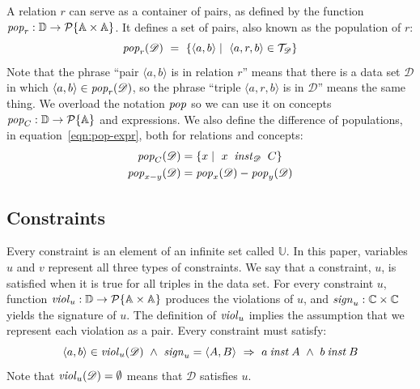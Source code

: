 \documentclass[runningheads]{llncs}
\newcommand{\id}[1]{\text{\it #1\/}}
\newcommand{\popF}[1]{\id{pop}_{#1}}
\newcommand{\pop}[2]{\popF{#1}(#2)}
\newcommand{\instance}{\mathbin{\id{inst}}}
\newcommand{\viol}[2]{\violC{#1}(#2)}
\newcommand{\violC}[1]{\id{viol}_{#1}}
\newcommand{\sign}[1]{\id{sign}_{#1}}
\newcommand{\powerset}[1]{\cal{P}\{#1\}}
\newcommand{\declare}[3]{\id{#1}_{\pair{#2}{#3}}}
\newcommand{\pair}[2]{\langle{#1},{#2}\rangle}
\newcommand{\Pair}[2]{#1\times#2}
\newcommand{\triple}[3]{\langle{#1},{#2},{#3}\rangle}
\newcommand{\Atoms}{\mathbb{A}}
\newcommand{\Concepts}{\mathbb{C}}
\newcommand{\triples}{\mathcal{T}}
\newcommand{\Constraints}{\mathbb{U}}
\newcommand{\dataset}{\mathscr{D}}
\newcommand{\Dataset}{\mathbb{D}}
\begin{document}
   A relation $r$ can serve as a container of pairs,
   as defined by the function $\popF{r}:\Dataset\rightarrow\powerset{\Pair{\Atoms}{\Atoms}}$.
   It defines a set of pairs, also known as the population of $r$:
\begin{equation}
   \pop{r}{\dataset}\ =\ \{ \pair{a}{b}\mid\ \triple{a}{r}{b}\in\triples_{\dataset}\}
\label{eqn:pop-rel}
\end{equation}
   Note that the phrase ``pair $\pair{a}{b}$ is in relation $r$'' means that there is a data set $\dataset$ in which $\pair{a}{b}\in\pop{r}{\dataset}$,
   so the phrase ``triple $\triple{a}{r}{b}$ is in $\dataset$'' means the same thing.
%
   We overload the notation $\popF{}$ so we can use it on concepts $\popF{C}:\Dataset\rightarrow\powerset{\Atoms}$
   and expressions. We also define the difference of populations, in equation~\ref{eqn:pop-expr}, both for relations and concepts:
\begin{align}
   \pop{C}{\dataset}&= \{ x\mid\ x\ \instance_{\dataset}\ C\}
\label{eqn:pop-concept}\\
   \pop{x-y}{\dataset}&= \pop{x}{\dataset} - \pop{y}{\dataset}
\label{eqn:pop-expr}
\end{align}

\subsection{Constraints}
\label{sct:Constraints}
   Every constraint is an element of an infinite set called $\Constraints$.
   In this paper, variables $u$ and $v$ represent all three types of constraints.
   We say that a constraint, $u$, is satisfied when it is true for all triples in the data set.
   For every constraint $u$, function $\violC{u}:\Dataset\rightarrow\powerset{\Pair{\Atoms}{\Atoms}}$ produces the violations of $u$,
   and $\sign{u}:\Pair{\Concepts}{\Concepts}$ yields the signature of $u$.
   The definition of $\violC{u}$ implies the assumption that we represent each violation as a pair.
   Every constraint must satisfy:
\begin{equation}
   \pair{a}{b}\in\viol{u}{\dataset}\ \wedge\ \sign{u}=\pair{A}{B}\ \Rightarrow\ a\instance A\ \wedge\ b\instance B
\label{eqn:wellTypedViolation}
\end{equation}
   Note that $\viol{u}{\dataset}=\emptyset$ means that $\dataset$ satisfies $u$.
\end{document}
